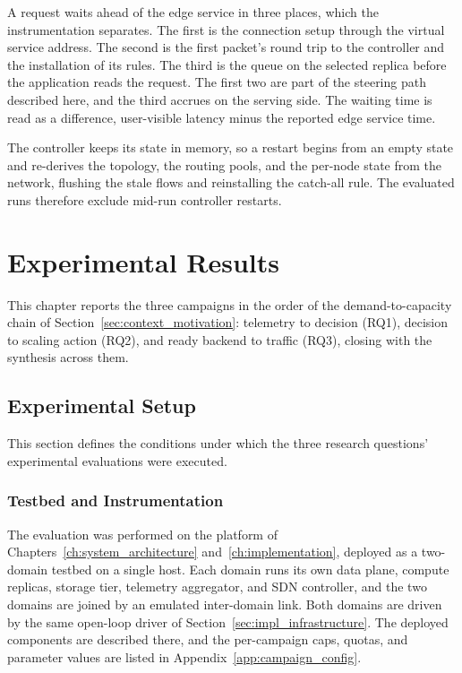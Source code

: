 ﻿\documentclass[12pt,reqno,twoside]{amsbook}
\begin{document}
A request waits ahead of the edge service in three places, which the
instrumentation separates. The first is the connection setup through the
virtual service address. The second is the first packet's round trip to
the controller and the installation of its rules. The third is the queue
on the selected replica before the application reads the request. The
first two are part of the steering path described here, and the third
accrues on the serving side. The waiting time is read as a difference,
user-visible latency minus the reported edge service time.

The controller keeps its state in memory, so a restart begins from an empty
state and re-derives the topology, the routing pools, and the per-node state
from the network, flushing the stale flows and reinstalling the catch-all
rule. The evaluated runs therefore exclude mid-run controller restarts.

\chapter{Experimental Results}\label{ch:results}
This chapter reports the three campaigns in the order of the demand-to-capacity
chain of Section~\ref{sec:context_motivation}: telemetry to decision (RQ1),
decision to scaling action (RQ2), and ready backend to traffic (RQ3), closing
with the synthesis across them.

\section{Experimental Setup}\label{sec:experimental_setup}
This section defines the conditions under which the three research questions'
experimental evaluations were executed.

\subsection{Testbed and Instrumentation}
The evaluation was performed on the platform of
Chapters~\ref{ch:system_architecture} and~\ref{ch:implementation}, deployed as
a two-domain testbed on a single host. Each domain runs its own data plane,
compute replicas, storage tier, telemetry aggregator, and \ac{SDN}
controller, and the two domains are joined by an emulated inter-domain link. Both
domains are driven by the same open-loop driver of
Section~\ref{sec:impl_infrastructure}. The deployed components
are described there, and the per-campaign
caps, quotas, and parameter values are listed in
Appendix~\ref{app:campaign_config}.
\end{document}
